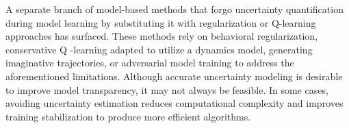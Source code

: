 A separate branch of model-based methods that forgo uncertainty quantification during model learning by substituting it with regularization or Q-learning approaches has surfaced. These methods rely on behavioral regularization, conservative Q -learning adapted to utilize a dynamics model, generating imaginative trajectories, or adversarial model training to address the aforementioned limitations. Although accurate uncertainty modeling is desirable to improve model transparency, it may not always be feasible. In some cases, avoiding uncertainty estimation reduces computational complexity and improves training stabilization to produce more efficient algorithms. 








 








